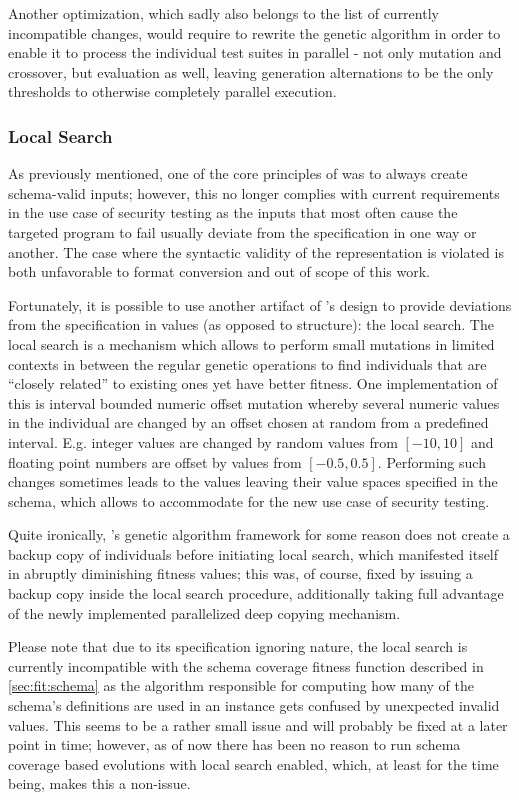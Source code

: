 Another optimization, which sadly also belongs to the list of currently incompatible changes, would require to
rewrite the genetic algorithm in order to enable it to process the individual test suites in parallel -
not only mutation and crossover, but evaluation as well, leaving generation alternations to be the only
thresholds to otherwise completely parallel execution.
\subsubsection{Local Search}
As previously mentioned, one of the core principles of \xmlmate was to always create schema-valid inputs; 
however, this no longer complies with current requirements in the use case of security testing as the 
inputs that most often cause the targeted program to fail usually deviate from the specification in 
one way or another. The case where the syntactic validity of the \xml representation is violated is 
both unfavorable to format conversion and out of scope of this work.

Fortunately, it is possible to use another artifact of \evosuite's design to provide deviations from the 
specification in values (as opposed to structure): the local search. 
The local search is a mechanism which allows to perform small mutations in limited contexts in between 
the regular genetic operations to find individuals that are ``closely related'' to existing ones
yet have better fitness. One implementation of this is interval bounded numeric offset mutation whereby
several numeric values in the individual are changed by an offset chosen at random from a predefined 
interval. E.g. integer values are changed by random values from $[-10,10]$ and floating point numbers 
are offset by values from $[-0.5,0.5]$.
Performing such changes sometimes leads to the values leaving their value spaces specified in the schema, 
which allows to accommodate for the new use case of security testing.

Quite ironically, \evosuite's genetic algorithm framework for some reason does not create a backup 
copy of individuals before initiating local search, which manifested itself in abruptly diminishing 
fitness values; this was, of course, fixed by issuing a backup copy inside the local search procedure, 
additionally taking full advantage of the newly implemented parallelized deep copying mechanism.

Please note that due to its specification ignoring nature, the local search is currently incompatible with the
schema coverage fitness function described in \cref{sec:fit:schema} as the algorithm responsible for computing
how many of the schema's definitions are used in an \xml instance gets confused by unexpected invalid values.
This seems to be a rather small issue and will probably be fixed at a later point in time; however, as of now
there has been no reason to run schema coverage based evolutions with local search enabled, which, at least for
the time being, makes this a non-issue.
